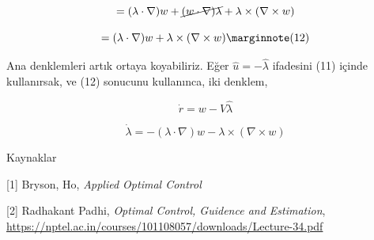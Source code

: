 \documentclass[12pt,fleqn]{article}\usepackage{../../common}
\begin{document}
$$
= (\lambda \cdot \nabla) w + 
\cancel{(w \cdot \nabla) \lambda} +
\lambda \times (\nabla \times w) 
$$

$$
= (\lambda \cdot \nabla) w + \lambda \times (\nabla \times w) 
\mlabel{12}
$$

Ana denklemleri artık ortaya koyabiliriz. Eğer $\hat{u} = -\hat{\lambda}$
ifadesini (11) içinde kullanırsak, ve (12) sonucunu kullanınca, iki
denklem,

$$
\dot{r} = w - V\hat{\lambda}
$$

$$
\dot{\lambda} = -(\lambda \cdot \nabla) w - \lambda \times (\nabla \times w) 
$$

Kaynaklar

[1] Bryson, Ho, {\em Applied Optimal Control}

[2] Radhakant Padhi, {\em Optimal Control, Guidence and Estimation}, 
    \url{https://nptel.ac.in/courses/101108057/downloads/Lecture-34.pdf}
\end{document}
